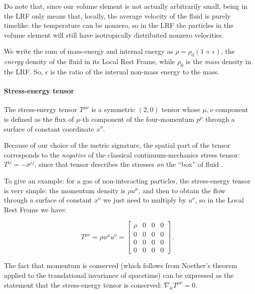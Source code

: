 \documentclass[main.tex]{subfiles}
\begin{document}
Do note that, since our volume element is not actually arbitrarily small, being in the LRF only means that, locally, the average velocity of the fluid is purely timelike: the temperature can be nonzero, so in the LRF the particles in the volume element will still have isotropically distributed nonzero velocities.

We write the sum of mass-energy and internal energy as $\rho = \rho_0 (1+\epsilon)$, the \emph{energy} density of the fluid in its Local Rest Frame, while \(\rho_0\) is the \emph{mass} density in the LRF.
So, $\epsilon$ is the ratio of the internal non-mass energy to the mass.

\paragraph{Stress-energy tensor} \label{par:stress-energy-tensor}

The stress-energy tensor \(T^{\mu\nu}\) is a symmetric \((2,0)\) tensor whose \(\mu, \nu\) component is defined as the flux of \(\mu\)-th component of the four-momentum \(p^\mu\) through a surface of constant coordinate \(x^\nu\).

Because of our choice of the metric signature, the spatial part of the tensor corresponds to the \emph{negative} of the classical continuum-mechanics stress tensor: \(T^{ij} = - \sigma^{ij}\), since that tensor describes the stresses \emph{on} the ``box'' of fluid \cite[]{Moretti:2016}.

To give an example: for a gas of non-interacting particles, the stress-energy tensor is very simple: the momentum density is \(\rho u^\mu\), and then to obtain the flow through a surface of constant \(x^\nu\) we just need to multiply by \(u^\nu\), so in the Local Rest Frame we have:

\begin{equation}
    T^{\mu\nu} = \rho u^\mu u^\nu = \begin{bmatrix}
    \rho    & 0  &  0 & 0 \\
      0 & 0  & 0  & 0 \\
      0 & 0  & 0  & 0 \\
      0 & 0  & 0  & 0
    \end{bmatrix}\,.
\end{equation}

The fact that momentum is conserved (which follows from Noether's theorem applied to the translational invariance of spacetime) can be expressed as the statement that the stress-energy tensor is conserved: \(\nabla_\mu T^{\mu\nu} = 0\).
\end{document}
